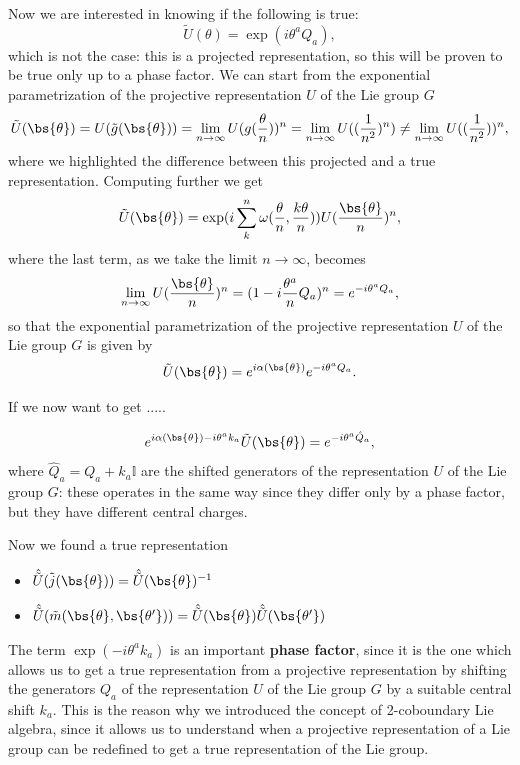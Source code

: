 Now we are interested in knowing if the following is true:
\[
    \tilde{U}(\theta) = \exp(i\theta^a Q_a),
\]
which is not the case: this is a projected representation, so this will be proven to be true only up to a phase factor. We can start from the exponential parametrization of the projective representation \(U\) of the Lie group \(G\)
\[
    \tilde{U}(\bs{\theta}) = U(\tilde{g}(\bs{\theta})) = \lim_{n \to \infty} U(g(\frac{\theta}{n}))^n = \lim_{n \to \infty} U((\frac{1}{n^2})^n) \neq \lim_{n \to \infty} U((\frac{1}{n^2}))^n,
\]
where we highlighted the difference between this projected and a true representation. Computing further we get
\[
    \tilde{U}(\bs{\theta}) = \exp(i \sum_{k}^{n} \omega(\frac{\theta}{n}, \frac{k\theta}{n})) U(\frac{\bs{\theta}}{n})^n,
\]
where the last term, as we take the limit \(n \to \infty\), becomes
\[
    \lim_{n \to \infty} U(\frac{\bs{\theta}}{n})^n = (1 - i \frac{\theta^a}{n} Q_a)^n = e^{-i \theta^a Q_a},
\]
so that the exponential parametrization of the projective representation \(U\) of the Lie group \(G\) is given by
\[
    \tilde{U}(\bs{\theta}) = e^{i \alpha(\bs{\theta})} e^{-i \theta^a Q_a}.
\]

If we now want to get .....

\[
    e^{i \alpha(\bs{\theta}) - i \theta^a k_a} \tilde{U}(\bs{\theta}) = e^{-i \theta^a \hat{Q}_a},
\]
where \(\hat{Q}_a = Q_a + k_a \mathbb{I}\) are the shifted generators of the representation \(U\) of the Lie group \(G\): these operates in the same way since they differ only by a phase factor, but they have different central charges.

Now we found a true representation
\begin{itemize}
    \item \(\hat{\tilde{U}}(\tilde{j}(\bs{\theta})) = \hat{\tilde{U}}(\bs{\theta})^{-1}\)
    \item \(\hat{\tilde{U}}(\tilde{m}(\bs{\theta}, \bs{\theta'})) = \hat{\tilde{U}}(\bs{\theta}) \hat{\tilde{U}}(\bs{\theta'})\)
\end{itemize}

The term \(\exp(-i \theta^a k_a)\) is an important \textbf{phase factor}, since it is the one which allows us to get a true representation from a projective representation by shifting the generators \(Q_a\) of the representation \(U\) of the Lie group \(G\) by a suitable central shift \(k_a\). This is the reason why we introduced the concept of 2-coboundary Lie algebra, since it allows us to understand when a projective representation of a Lie group can be redefined to get a true representation of the Lie group.

